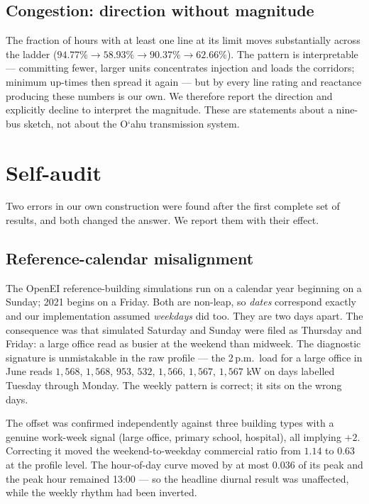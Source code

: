 \documentclass[11pt,a4paper]{article}
\theoremstyle{definition}
\theoremstyle{plain}
\theoremstyle{remark}
\newcommand{\okina}{\textquoteleft}
\newcommand{\Oahu}{O\okina ahu}
\begin{document}
\subsection{Congestion: direction without magnitude}
\label{sec:congestion}

The fraction of hours with at least one line at its limit moves substantially
across the ladder ($94.77\% \to 58.93\% \to 90.37\% \to 62.66\%$). The pattern
is interpretable --- committing fewer, larger units concentrates injection and
loads the corridors; minimum up-times then spread it again --- but by
 every line rating and reactance producing these numbers is
our own. We therefore report the direction and explicitly decline to interpret
the magnitude. These are statements about a nine-bus sketch, not about the
\Oahu{} transmission system.

\section{Self-audit}
\label{sec:audit}

Two errors in our own construction were found after the first complete set of
results, and both changed the answer. We report them with their effect.

\subsection{Reference-calendar misalignment}

The OpenEI reference-building simulations run on a calendar year beginning on a
Sunday; 2021 begins on a Friday. Both are non-leap, so \emph{dates} correspond
exactly and our implementation assumed \emph{weekdays} did too. They are two
days apart. The consequence was that simulated Saturday and Sunday were filed
as Thursday and Friday: a large office read as busier at the weekend than
midweek. The diagnostic signature is unmistakable in the raw profile --- the
2\,p.m.\ load for a large office in June reads $1{,}568$, $1{,}568$, $953$,
$532$, $1{,}566$, $1{,}567$, $1{,}567$ \si{\kilo\watt} on days labelled Tuesday
through Monday. The weekly pattern is correct; it sits on the wrong days.

The offset was confirmed independently against three building types with a
genuine work-week signal (large office, primary school, hospital), all implying
$+2$. Correcting it moved the weekend-to-weekday commercial ratio from $1.14$ to
$0.63$ at the profile level. The hour-of-day curve moved by at most $0.036$ of
its peak and the peak hour remained 13:00 --- so the headline diurnal result
was unaffected, while the weekly rhythm had been inverted.
\end{document}
